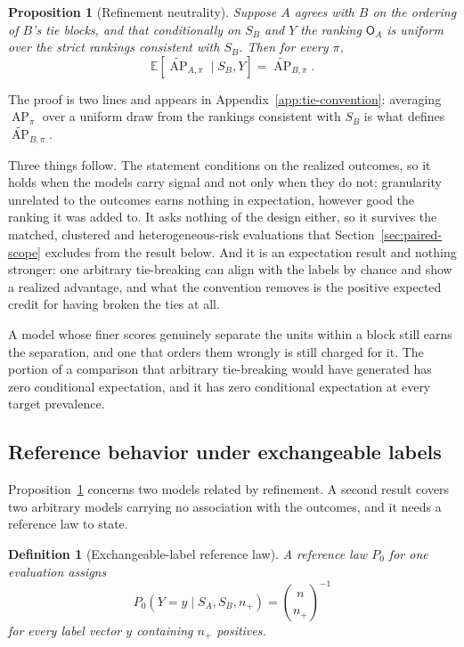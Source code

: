 \documentclass[11pt]{article}
\newcommand{\AP}{\operatorname{AP}}
\newcommand{\E}{\mathbb{E}}
\newcommand{\APta}{\widetilde{\AP}}
\newcommand{\Rank}{\mathsf{O}}
\newtheorem{definition}{Definition}
\newtheorem{proposition}{Proposition}
\theoremstyle{remark}
\begin{document}
\begin{proposition}[Refinement neutrality]
\label{prop:refinement}
Suppose $A$ agrees with $B$ on the ordering of $B$'s tie blocks, and that conditionally on $S_B$ and $Y$ the ranking $\Rank_A$ is uniform over the strict rankings consistent with $S_B$. Then for every $\pi$,
\[
\E\left[\APta_{A,\pi}\mid S_B,Y\right]
=
\APta_{B,\pi}.
\]
\end{proposition}

The proof is two lines and appears in Appendix~\ref{app:tie-convention}: averaging $\AP_\pi$ over a uniform draw from the rankings consistent with $S_B$ is what defines $\APta_{B,\pi}$.

Three things follow. The statement conditions on the realized outcomes, so it holds when the models carry signal and not only when they do not: granularity unrelated to the outcomes earns nothing in expectation, however good the ranking it was added to. It asks nothing of the design either, so it survives the matched, clustered and heterogeneous-risk evaluations that Section~\ref{sec:paired-scope} excludes from the result below. And it is an expectation result and nothing stronger: one arbitrary tie-breaking can align with the labels by chance and show a realized advantage, and what the convention removes is the positive expected credit for having broken the ties at all.

A model whose finer scores genuinely separate the units within a block still earns the separation, and one that orders them wrongly is still charged for it. The portion of a comparison that arbitrary tie-breaking would have generated has zero conditional expectation, and it has zero conditional expectation at every target prevalence.

\subsection{Reference behavior under exchangeable labels}
\label{sec:reference-law}

Proposition~\ref{prop:refinement} concerns two models related by refinement. A second result covers two arbitrary models carrying no association with the outcomes, and it needs a reference law to state.

\begin{definition}[Exchangeable-label reference law]
\label{def:label-condition}
A reference law $P_0$ for one evaluation assigns
\[
P_0\left(Y=y\mid S_A,S_B,n_+\right)
=
\binom{n}{n_+}^{-1}
\]
for every label vector $y$ containing $n_+$ positives.
\end{definition}
\end{document}

